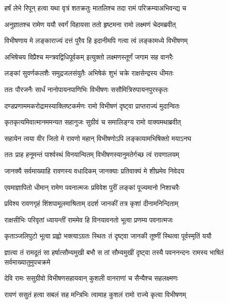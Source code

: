 \twolineshloka
{हर्षं लेभे रिपून् हत्वा यथा वृत्रं शतक्रतुः}
{मातलिश्च तदा रामं परिक्रम्याअभिवन्द्य च} %

\twolineshloka
{अनुज्ञातश्च रामेण ययौ स्वर्गं विहायसा}
{ततो हृष्टमना रामो लक्ष्मणं चेदमब्रवीत्} %

\twolineshloka
{विभीषणाय मे लङ्काराज्यं दत्तं पुरैव हि}
{इदानीमपि गत्वा त्वं लङ्कामध्ये विभीषणम्} %

\twolineshloka
{अभिषेचय विप्रैश्च मन्त्रवद्विधिपूर्वकम्}
{इत्युक्तो लक्ष्मणस्तूर्णं जगाम सह वानरैः} %

\twolineshloka
{लङ्कां सुवर्णकलशैः समुद्रजलसंयुतैः}
{अभिषेकं शुभं चक्रे राक्षसेन्द्रस्य धीमतः} %

\twolineshloka
{ततः पौरजनैः सार्धं नानोपायनपाणिभिः}
{विभीषणः ससौमित्रिरुपायनपुरस्कृतः} %

\twolineshloka
{दण्डप्रणाममकरोद्रामस्याक्लिष्टकर्मणः}
{रामो विभीषणं दृष्ट्वा प्राप्तराज्यं मुदान्वितः} %

\twolineshloka
{कृतकृत्यमिवात्मानममन्यत सहानुजः}
{सुग्रीवं च समालिङ्ग्य रामो वाक्यमथाब्रवीत्} %

\twolineshloka
{सहायेन त्वया वीर जितो मे रावणो महान्}
{विभीषणोऽपि लङ्कायामभिषिक्तो मयाऽनघ} %

\twolineshloka
{ततः प्राह हनूमन्तं पार्श्वस्थं विनयान्वितम्}
{विभीषणस्यानुमतेर्गच्छ त्वं रावणालयम्} %

\twolineshloka
{जानक्यै सर्वमाख्याहि रावणस्य वधादिकम्}
{जानक्याः प्रतिवाक्यं मे शीघ्रमेव निवेदय} %

\twolineshloka
{एवमाज्ञापितो धीमान् रामेण पवनात्मजः}
{प्रविवेश पुरीं लङ्कां पूज्यमानो निशाचरैः} %

\twolineshloka
{प्रविश्य रावणगृहं शिंशपामूलमाश्रिताम्}
{ददर्श जानकीं तत्र कृशां दीनामनिन्दिताम्} %

\twolineshloka
{राक्षसीभिः परिवृतां ध्यायन्तीं राममेव हि}
{विनयावनतो भूत्वा प्रणम्य पवनात्मजः} %

\twolineshloka
{कृताञ्जलिपुटो भूत्वा प्रह्वो भक्त्याऽग्रतः स्थितः}
{तं दृष्ट्वा जानकी तूष्णीं स्थित्वा पूर्वस्मृतिं ययौ} %

\threelineshloka
{ज्ञात्वा तं रामदूतं सा हर्षात्सौम्यमुखी बभौ}
{स तां सौम्यमुखीं दृष्ट्वा तस्यै पवननन्दनः}
{रामस्य भाषितं सर्वमाख्यातुमुपचक्रमे} %

\twolineshloka
{देवि रामः ससुग्रीवो विभीषणसहायवान्}
{कुशली वानराणां च सैन्यैश्च सहलक्ष्मणः} %

\twolineshloka
{रावणं ससुतं हत्वा सबलं सह मन्त्रिभिः}
{त्वामाह कुशलं रामो राज्ये कृत्वा विभीषणम्} %

